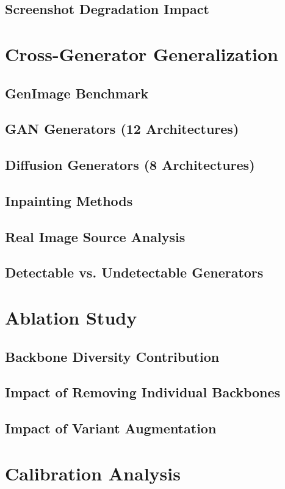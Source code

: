 \documentclass[12pt,a4paper]{book}
\theoremstyle{definition}
\theoremstyle{remark}
\begin{document}
\subsection{Screenshot Degradation Impact}

\section{Cross-Generator Generalization}\label{sec:cross-gen}
\subsection{GenImage Benchmark}
\subsection{GAN Generators (12 Architectures)}
\subsection{Diffusion Generators (8 Architectures)}
\subsection{Inpainting Methods}
\subsection{Real Image Source Analysis}
\subsection{Detectable vs. Undetectable Generators}

\section{Ablation Study}\label{sec:ablation}
\subsection{Backbone Diversity Contribution}
\subsection{Impact of Removing Individual Backbones}
\subsection{Impact of Variant Augmentation}

\section{Calibration Analysis}\label{sec:calib-results}
\end{document}
